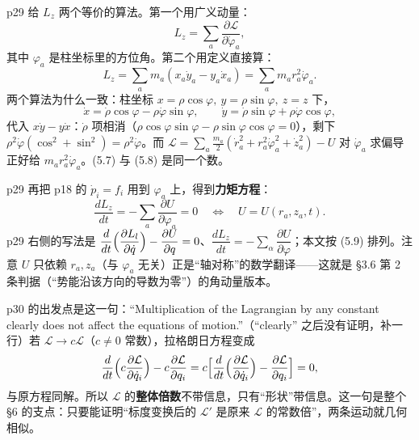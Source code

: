 \documentclass[11pt]{ctexart}
\begin{document}

p29 给 $L_z$ 两个等价的算法。第一个用广义动量：
\[
L_z=\sum_a\frac{\partial\mathcal{L}}{\partial\dot\varphi_a}, \tag{5.7}
\]
其中 $\varphi_a$ 是柱坐标里的方位角。第二个用定义直接算：
\[
L_z=\sum_am_a(x_a\dot y_a-y_a\dot x_a)=\sum_am_ar_a^2\dot\varphi_a . \tag{5.8}
\]
两个算法为什么一致：柱坐标 $x=\rho\cos\varphi,\ y=\rho\sin\varphi,\ z=z$ 下，
\[
\dot x=\dot\rho\cos\varphi-\rho\dot\varphi\sin\varphi,\qquad
\dot y=\dot\rho\sin\varphi+\rho\dot\varphi\cos\varphi ,
\]
代入 $x\dot y-y\dot x$：$\dot\rho$ 项相消（$\rho\cos\varphi\sin\varphi-\rho\sin\varphi\cos\varphi=0$），剩下 $\rho^2\dot\varphi(\cos^2+\sin^2)=\rho^2\dot\varphi$。而 $\mathcal{L}=\sum_a\frac{m_a}{2}(\dot r_a^2+r_a^2\dot\varphi_a^2+\dot z_a^2)-U$ 对 $\dot\varphi_a$ 求偏导正好给 $m_ar_a^2\dot\varphi_a$。(5.7) 与 (5.8) 是同一个数。

p29 再把 p18 的 $\dot p_i=f_i$ 用到 $\varphi_a$ 上，得到\textbf{力矩方程}：
\[
\frac{dL_z}{dt}=-\sum_a\frac{\partial U}{\partial\varphi_a}=0
\quad\Longleftrightarrow\quad
U=U(r_a,z_a,t). \tag{5.9}
\]
p29 右侧的写法是 $\dfrac{d}{dt}\Bigl(\dfrac{\partial L_l}{\partial\dot q}\Bigr)-\dfrac{\partial U}{\partial q}=0$、$\dfrac{dL_z}{dt}=-\sum_\alpha\dfrac{\partial U}{\partial\varphi}$；本文按 (5.9) 排列。注意 $U$ 只依赖 $r_a,z_a$（与 $\varphi_a$ 无关）正是“轴对称”的数学翻译——这就是 §3.6 第 2 条判据（“势能沿该方向的导数为零”）的角动量版本。




p30 的出发点是这一句：“Multiplication of the Lagrangian by any constant clearly does not affect the equations of motion.”（“clearly” 之后没有证明，补一行）若 $\mathcal{L}\to c\mathcal{L}$（$c\ne0$ 常数），拉格朗日方程变成
\[
\frac{d}{dt}\Bigl(c\frac{\partial\mathcal{L}}{\partial\dot q_i}\Bigr)-c\frac{\partial\mathcal{L}}{\partial q_i}
=c\Bigl[\frac{d}{dt}\Bigl(\frac{\partial\mathcal{L}}{\partial\dot q_i}\Bigr)-\frac{\partial\mathcal{L}}{\partial q_i}\Bigr]=0 ,
\]
与原方程同解。所以 $\mathcal{L}$ 的\textbf{整体倍数}不带信息，只有“形状”带信息。这一句是整个 §6 的支点：只要能证明“标度变换后的 $\mathcal{L}'$ 是原来 $\mathcal{L}$ 的常数倍”，两条运动就几何相似。
\end{document}
